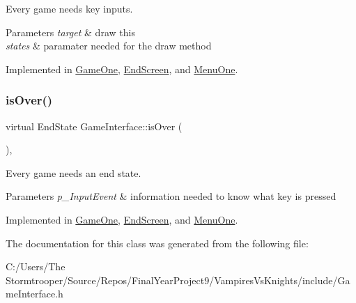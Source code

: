 Every game needs key inputs. 


\begin{DoxyParams}{Parameters}
{\em target} & draw this \\
\hline
{\em states} & paramater needed for the draw method \\
\hline
\end{DoxyParams}


Implemented in \mbox{\hyperlink{class_game_one_ae1ecd54039b4a3650f0d113ef4629da3}{Game\+One}}, \mbox{\hyperlink{class_end_screen_a33052db95f0c2aab9e4b2e0cbeec9e8e}{End\+Screen}}, and \mbox{\hyperlink{class_menu_one_aee28812124909d8734eeeaecfde35f0f}{Menu\+One}}.

\mbox{\label{class_game_interface_a5bad60f237214cb1ec013e221ed16f45}} 
\subsubsection{\texorpdfstring{is\+Over()}{isOver()}}
{\footnotesize\ttfamily virtual End\+State Game\+Interface\+::is\+Over (\begin{DoxyParamCaption}{ }\end{DoxyParamCaption})\hspace{0.3cm}{\ttfamily [protected]}, {}}



Every game needs an end state. 


\begin{DoxyParams}{Parameters}
{\em p\+\_\+\+Input\+Event} & information needed to know what key is pressed \\
\hline
\end{DoxyParams}


Implemented in \mbox{\hyperlink{class_game_one_a9e9050de230336fac769ab5e8b23f7f8}{Game\+One}}, \mbox{\hyperlink{class_end_screen_acd13799a074bb1984352a5262c3e3f29}{End\+Screen}}, and \mbox{\hyperlink{class_menu_one_aa1d50806994903b77d44d241d7755404}{Menu\+One}}.



The documentation for this class was generated from the following file\+:\begin{DoxyCompactItemize}
\item 
C\+:/\+Users/\+The Stormtrooper/\+Source/\+Repos/\+Final\+Year\+Project9/\+Vampires\+Vs\+Knights/include/Game\+Interface.\+h\end{DoxyCompactItemize}
